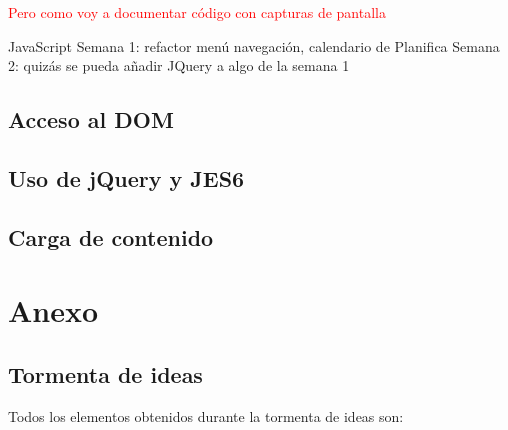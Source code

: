 \documentclass[11pt, a4paper]{book}
\begin{document}
	\textcolor{red}{Pero como voy a documentar código con capturas de pantalla}
	
	JavaScript
	Semana 1: refactor menú navegación, calendario de Planifica
	Semana 2: quizás se pueda añadir JQuery a algo de la semana 1
	
	\section{Acceso al DOM}
	
	\section{Uso de jQuery y JES6}
	
	\section{Carga de contenido}
	
	
	
	
	
	\chapter{Anexo}
	\label{chap:anexo1}
	\section{Tormenta de ideas}
	
	Todos los elementos obtenidos durante la tormenta de ideas son:
	
\end{document}
